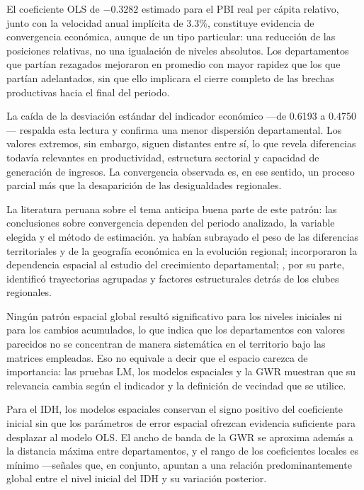 El coeficiente OLS de $-0.3282$ estimado para el PBI real per cápita
relativo, junto con la velocidad anual implícita de 3.3\%, constituye
evidencia de convergencia económica, aunque de un tipo particular: una
reducción de las posiciones relativas, no una igualación de niveles
absolutos. Los departamentos que partían rezagados mejoraron en promedio con
mayor rapidez que los que partían adelantados, sin que ello implicara el
cierre completo de las brechas productivas hacia el final del periodo.
 
La caída de la desviación estándar del indicador económico —de 0.6193 a
0.4750— respalda esta lectura y confirma una menor dispersión departamental.
Los valores extremos, sin embargo, siguen distantes entre sí, lo que revela
diferencias todavía relevantes en productividad, estructura sectorial y
capacidad de generación de ingresos. La convergencia observada es, en ese
sentido, un proceso parcial más que la desaparición de las desigualdades
regionales.
 
La literatura peruana sobre el tema anticipa buena parte de este patrón: las
conclusiones sobre convergencia dependen del periodo analizado, la variable
elegida y el método de estimación. \textcite{gonzales_trelles2004} ya habían
subrayado el peso de las diferencias territoriales y de la geografía
económica en la evolución regional; \textcite{palomino_rodriguez2019}
incorporaron la dependencia espacial al estudio del crecimiento
departamental; \textcite{pazparedes2023}, por su parte, identificó
trayectorias agrupadas y factores estructurales detrás de los clubes
regionales.
 
Ningún patrón espacial global resultó significativo para los niveles
iniciales ni para los cambios acumulados, lo que indica que los
departamentos con valores parecidos no se concentran de manera sistemática
en el territorio bajo las matrices empleadas. Eso no equivale a decir que el
espacio carezca de importancia: las pruebas LM, los modelos espaciales y la
GWR muestran que su relevancia cambia según el indicador y la definición de
vecindad que se utilice.
 
Para el IDH, los modelos espaciales conservan el signo positivo del
coeficiente inicial sin que los parámetros de error espacial ofrezcan
evidencia suficiente para desplazar al modelo OLS. El ancho de banda de la
GWR se aproxima además a la distancia máxima entre departamentos, y el rango
de los coeficientes locales es mínimo —señales que, en conjunto, apuntan a
una relación predominantemente global entre el nivel inicial del IDH y su
variación posterior.
 
